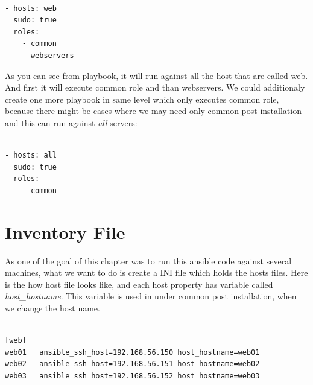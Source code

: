 \documentclass[10pt]{book}
\begin{document}
\begin{Verbatim} 
 
- hosts: web
  sudo: true
  roles: 
    - common
    - webservers

\end{Verbatim}  

As you can see from playbook, it will run against all the host that are called 
web. And first it will execute common role and than webservers. We could 
additionaly create one more playbook in same level which only executes common 
role, because there might be cases where we may need only common post 
installation and this can run against \emph{all} servers:

\begin{Verbatim} 
 
- hosts: all
  sudo: true
  roles: 
    - common

\end{Verbatim}  

\section{Inventory File}
As one of the goal of this chapter was to run this ansible code against several 
machines, what we want to do is create a INI file which holds the hosts files. 
Here is the how host file looks like, and each host property has variable called 
\emph{host\_hostname}. This variable is used in under common post installation, 
when we change the host name. 

\begin{Verbatim} 
 
[web]
web01	ansible_ssh_host=192.168.56.150	host_hostname=web01
web02	ansible_ssh_host=192.168.56.151	host_hostname=web02
web03	ansible_ssh_host=192.168.56.152	host_hostname=web03

\end{Verbatim} 
\end{document}
